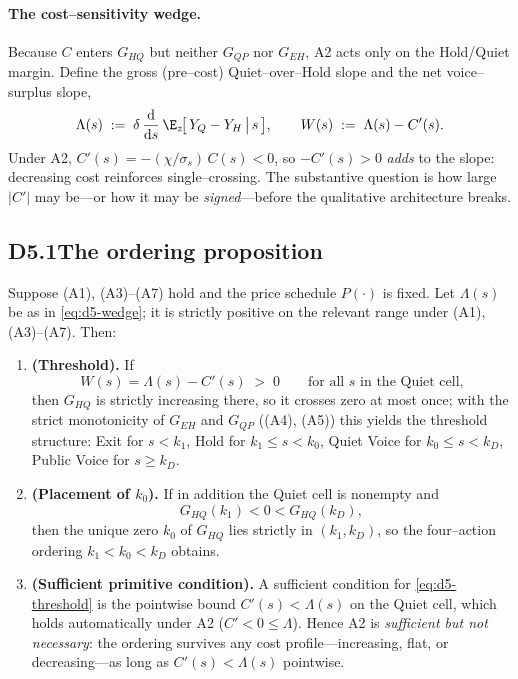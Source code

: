 \paragraph{The cost--sensitivity wedge.}
Because $C$ enters $G_{HQ}$ but neither $G_{QP}$ nor $G_{EH}$, A2 acts only on
the Hold/Quiet margin. Define the gross (pre--cost) Quiet--over--Hold slope and
the net voice--surplus slope,
\begin{equation}\label{eq:d5-wedge}
  \Lambda(s) \;:=\; \delta\,\frac{\mathrm d}{\mathrm d s}\,
     \E_z\!\big[\,Y_Q - Y_H \,\big|\, s\,\big],
  \qquad
  W(s)\;:=\;\Lambda(s)-C'(s).
\end{equation}
Under A2, $C'(s)=-(\chi/\sigma_s)\,C(s)<0$, so $-C'(s)>0$ \emph{adds} to the
slope: decreasing cost reinforces single--crossing. The substantive question is
how large $|C'|$ may be---or how it may be \emph{signed}---before the
qualitative architecture breaks.

\subsection*{D5.1\quad The ordering proposition}

\begin{proposition}\label{prop:d5-a2}
Suppose \textup{(A1)}, \textup{(A3)}--\textup{(A7)} hold and the price schedule
$P(\cdot)$ is fixed. Let $\Lambda(s)$ be as in \eqref{eq:d5-wedge}; it is
strictly positive on the relevant range under \textup{(A1)},
\textup{(A3)}--\textup{(A7)}. Then:
\begin{enumerate}
\item[\textnormal{(a)}] \textbf{(Threshold).} If
\begin{equation}\label{eq:d5-threshold}
  W(s)=\Lambda(s)-C'(s)\;>\;0\qquad\text{for all }s\text{ in the Quiet cell,}
\end{equation}
then $G_{HQ}$ is strictly increasing there, so it crosses zero at most once;
with the strict monotonicity of $G_{EH}$ and $G_{QP}$ (\textup{(A4)},
\textup{(A5)}) this yields the threshold structure: Exit for $s<k_1$, Hold for
$k_1\le s<k_0$, Quiet Voice for $k_0\le s<k_D$, Public Voice for $s\ge k_D$.
\item[\textnormal{(b)}] \textbf{(Placement of $k_0$).} If in addition the Quiet
cell is nonempty and
\begin{equation}\label{eq:d5-boundary}
  G_{HQ}(k_1)<0<G_{HQ}(k_D),
\end{equation}
then the unique zero $k_0$ of $G_{HQ}$ lies strictly in $(k_1,k_D)$, so the
four--action ordering $k_1<k_0<k_D$ obtains.
\item[\textnormal{(c)}] \textbf{(Sufficient primitive condition).} A sufficient
condition for \eqref{eq:d5-threshold} is the pointwise bound
$C'(s)<\Lambda(s)$ on the Quiet cell, which holds automatically under A2
($C'<0\le\Lambda$). Hence A2 is \emph{sufficient but not necessary}: the
ordering survives any cost profile---increasing, flat, or decreasing---as long
as $C'(s)<\Lambda(s)$ pointwise.
\end{enumerate}
\end{proposition}

